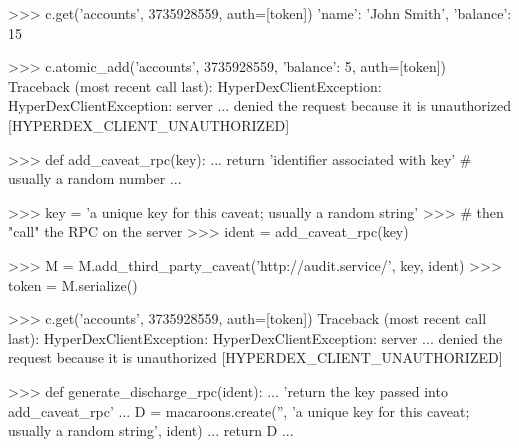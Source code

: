 \begin{pythoncode}
>>> c.get('accounts', 3735928559, auth=[token])
{'name': 'John Smith', 'balance': 15}
\end{pythoncode}

\begin{pythoncode}
>>> c.atomic_add('accounts', 3735928559, {'balance': 5}, auth=[token])
Traceback (most recent call last):
HyperDexClientException: HyperDexClientException: server ... denied the request because it is unauthorized [HYPERDEX_CLIENT_UNAUTHORIZED]
\end{pythoncode}

\begin{pythoncode}
>>> def add_caveat_rpc(key):
...     return 'identifier associated with key' # usually a random number
...
\end{pythoncode}

\begin{pythoncode}
>>> key = 'a unique key for this caveat; usually a random string'
>>> # then "call" the RPC on the server
>>> ident = add_caveat_rpc(key)
\end{pythoncode}

\begin{pythoncode}
>>> M = M.add_third_party_caveat('http://audit.service/', key, ident)
>>> token = M.serialize()
\end{pythoncode}

\begin{pythoncode}
>>> c.get('accounts', 3735928559, auth=[token])
Traceback (most recent call last):
HyperDexClientException: HyperDexClientException: server ... denied the request because it is unauthorized [HYPERDEX_CLIENT_UNAUTHORIZED]
\end{pythoncode}

\begin{pythoncode}
>>> def generate_discharge_rpc(ident):
...     'return the key passed into add_caveat_rpc'
...     D = macaroons.create('', 'a unique key for this caveat; usually a random string', ident)
...     return D
...
\end{pythoncode}

